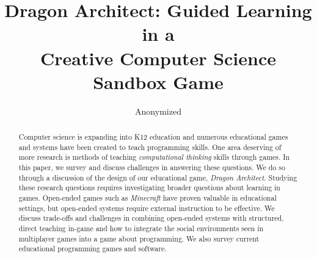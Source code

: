 \documentclass{sig-alternate}
\newcommand{\gametitle}{{\emph{Dragon Architect}}}
\begin{document}
%

\title{Dragon Architect: Guided Learning in a \\Creative Computer Science Sandbox Game}

\author{Anonymized}


\maketitle
\begin{abstract}
Computer science is expanding into K12 education and numerous educational games and systems have been created to teach programming skills. One area deserving of more research is methods of teaching \emph{computational thinking} skills through games. In this paper, we survey and discuss challenges in answering these questions. We do so through a discussion of the design of our educational game, \gametitle{}. Studying these research questions requires investigating broader questions about learning in games. Open-ended games such as \emph{Minecraft} have proven valuable in educational settings, but open-ended systems require external instruction to be effective. We discuss trade-offs and challenges in combining open-ended systems with structured, direct teaching in-game and how to integrate the social environments seen in multiplayer games into a game about programming. We also survey current educational programming games and software.
\end{abstract}
\end{document}
